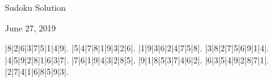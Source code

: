 \documentclass{article}
\begin{document}
\begin{center}
\Huge{Sudoku Solution}
\end{center}
\begin{center}
\Large{June 27, 2019}
\end{center}
\begin{sudoku}
|8|2|6|3|7|5|1|4|9|.
|5|4|7|8|1|9|3|2|6|.
|1|9|3|6|2|4|7|5|8|.
|3|8|2|7|5|6|9|1|4|.
|4|5|9|2|8|1|6|3|7|.
|7|6|1|9|4|3|2|8|5|.
|9|1|8|5|3|7|4|6|2|.
|6|3|5|4|9|2|8|7|1|.
|2|7|4|1|6|8|5|9|3|.
\end{sudoku}
\end{document}
